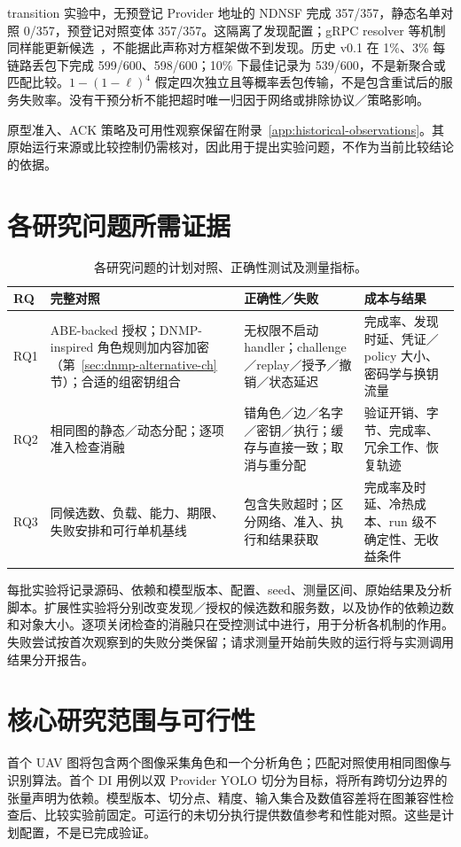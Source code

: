 transition 实验中，无预登记 Provider 地址的 NDNSF 完成 357/357，静态名单对照 0/357，预登记对照变体 357/357。这隔离了发现配置；gRPC resolver 等机制同样能更新候选~\cite{grpcresolver}，不能据此声称对方框架做不到发现。历史 v0.1 在 1\%、3\% 每链路丢包下完成 599/600、598/600；10\% 下最佳记录为 539/600，不是新聚合或匹配比较。$1-(1-\ell)^4$ 假定四次独立且等概率丢包传输，不是包含重试后的服务失败率。没有干预分析不能把超时唯一归因于网络或排除协议／策略影响。

原型准入、ACK 策略及可用性观察保留在附录~\ref{app:historical-observations}。其原始运行来源或比较控制仍需核对，因此用于提出实验问题，不作为当前比较结论的依据。
\section{各研究问题所需证据}
\begin{table}[htbp]\centering\small
\caption{各研究问题的计划对照、正确性测试及测量指标。}
\begin{tabularx}{\textwidth}{p{}XXX}
\toprule RQ & 完整对照 & 正确性／失败 & 成本与结果\\\midrule
RQ1 & ABE-backed 授权；DNMP-inspired 角色规则加内容加密（第~\ref{sec:dnmp-alternative-ch} 节）；合适的组密钥组合 & 无权限不启动 handler；challenge／replay／授予／撤销／状态延迟 & 完成率、发现时延、凭证／policy 大小、密码学与换钥流量\\\midrule
RQ2 & 相同图的静态／动态分配；逐项准入检查消融 & 错角色／边／名字／密钥／执行；缓存与直接一致；取消与重分配 & 验证开销、字节、完成率、冗余工作、恢复轨迹\\\midrule
RQ3 & 同候选数、负载、能力、期限、失败安排和可行单机基线 & 包含失败超时；区分网络、准入、执行和结果获取 & 完成率及时延、冷热成本、run 级不确定性、无收益条件\\\bottomrule
\end{tabularx}\end{table}

每批实验将记录源码、依赖和模型版本、配置、seed、测量区间、原始结果及分析脚本。扩展性实验将分别改变发现／授权的候选数和服务数，以及协作的依赖边数和对象大小。逐项关闭检查的消融只在受控测试中进行，用于分析各机制的作用。失败尝试按首次观察到的失败分类保留；请求测量开始前失败的运行将与实测调用结果分开报告。



\section{核心研究范围与可行性}
首个 UAV 图将包含两个图像采集角色和一个分析角色；匹配对照使用相同图像与识别算法。首个 DI 用例以双 Provider YOLO 切分为目标，将所有跨切分边界的张量声明为依赖。模型版本、切分点、精度、输入集合及数值容差将在图兼容性检查后、比较实验前固定。可运行的未切分执行提供数值参考和性能对照。这些是计划配置，不是已完成验证。

